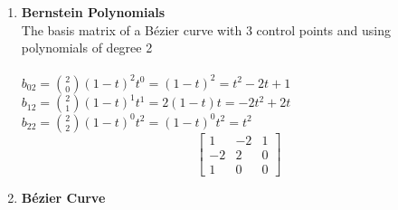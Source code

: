 \documentclass[12pt]{article}
\begin{document}
\begin{enumerate}

\pagebreak

\item  
\textbf{Bernstein Polynomials} \\
The basis matrix of a B\'ezier curve with 3 control points and using polynomials of degree 2 \\ \\
$b_{02} = \binom{2}{0} (1-t)^2 t^0 = (1-t)^2 = t^2 - 2t +1$ \\
$b_{12} = \binom{2}{1} (1-t)^1 t^1 = 2(1-t)t = -2t^2 + 2t $ \\
$b_{22} = \binom{2}{2} (1-t)^0 t^2 = (1-t)^0 t^2 = t^2$ \\

\[
\begin{bmatrix}
    1  & -2 & 1 \\
    -2 & 2  & 0 \\
    1  & 0  & 0
\end{bmatrix}
\]

\item
\textbf{B\'ezier Curve} \\
\end{enumerate}
\end{document}
